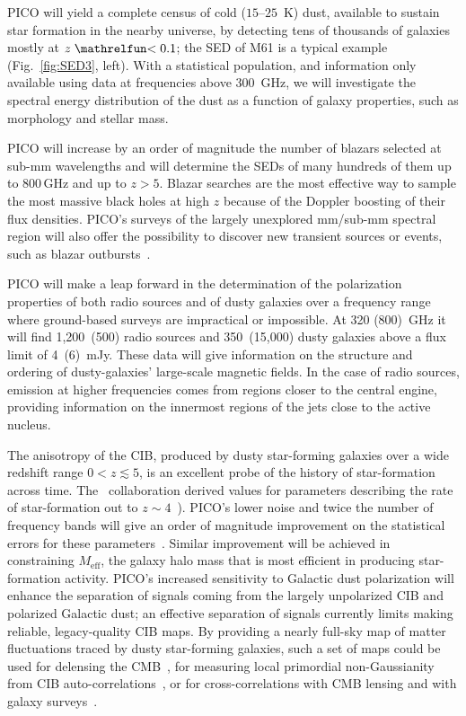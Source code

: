\documentclass[PICOReport.tex]{subfiles}
\begin{document}
PICO will yield a complete census of cold ($15$--$25$~K) dust, available to sustain star formation in the nearby universe, by detecting tens of thousands of galaxies mostly at $z\simlt 0.1$; the \ac{SED} of M61 is a typical example (Fig.~\ref{fig:SED3}, left). With a statistical population, and information only available using data at frequencies above 300~GHz, we will investigate the spectral energy distribution of the dust as a function of galaxy properties, such as morphology and stellar mass. 

PICO will increase by an order of magnitude the number of blazars selected at sub-mm wavelengths and will determine the SEDs of many hundreds of them up to 800\,GHz and up to $z> 5$. Blazar searches are the most effective way to sample the most massive black holes at high $z$ because of the Doppler boosting of their flux densities. PICO's surveys of the largely unexplored mm/sub-mm spectral region will also offer the possibility to discover new transient sources or events, such as blazar outbursts~\cite{Metzger2015}.

PICO will make a leap forward in the determination of the polarization properties of both radio sources and of dusty galaxies over a frequency range where ground-based surveys are impractical or impossible. At 320 (800)~GHz it will find 1,200~(500) radio sources and 350~(15,000) dusty galaxies above a flux limit of 4~(6)~mJy.  These data will give information on the structure and ordering of dusty-galaxies' large-scale magnetic fields. In the case of radio sources, emission at higher frequencies comes from regions closer to the central engine, providing information on the innermost regions of the jets close to the active nucleus. 

The anisotropy of the \ac{CIB}, produced by dusty star-forming galaxies over a wide redshift range $0 < z \lesssim 5$, is an excellent probe of the history of star-formation across time. The \planck\ collaboration derived values for parameters describing the rate of star-formation out to $z\sim4$~\cite{2014A&A...571A..30P,2014A&A...571A..18P,madau2014}). PICO's lower noise and twice the number of frequency bands will give an order of magnitude improvement on the statistical errors for these parameters~\cite{Wu:2016hej}. Similar improvement will be achieved in constraining $M_{\mathrm{eff}}$, the galaxy halo mass that is most efficient in producing star-formation activity. PICO's increased sensitivity to Galactic dust polarization will enhance the separation of signals coming from the largely unpolarized \ac{CIB} and polarized Galactic dust; an effective separation of signals currently limits making reliable, legacy-quality \ac{CIB} maps. 
By providing a nearly full-sky map of matter fluctuations traced by dusty star-forming galaxies, such a set of maps could be used for delensing the CMB~\cite{Sherwin/Schmittfull}, for measuring local primordial non-Gaussianity from \ac{CIB} auto-correlations~\cite{tucci}, or for cross-correlations with CMB lensing and with galaxy surveys~\cite{Schmittfull/Seljak}.
\end{document}
